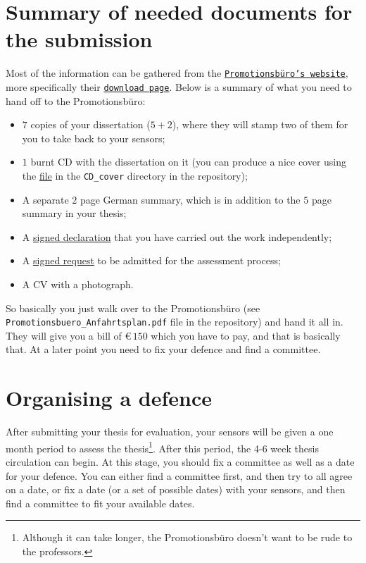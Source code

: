 \documentclass[a4paper]{article}
\begin{document}
    \section*{Summary of needed documents for the submission}
        Most of the information can be gathered from the \href{https://www.uni-frankfurt.de/42800906/startseite}{\texttt{Promotionsb\"uro's website}}, more specifically their \href{https://www.uni-frankfurt.de/42800991/downloads}{\texttt{download page}}.
        Below is a summary of what you need to hand off to the Promotionsb\"uro:
        \begin{itemize}
            \item $7$ copies of your dissertation ($5 + 2$), where they will stamp two of them for you to take back to your sensors;
            \item $1$ burnt CD with the dissertation on it (you can produce a nice cover using the \href{run:Cover.tex}{file} in the \texttt{CD\_cover} directory in the repository);
            \item A separate $2$ page German summary, which is in addition to the $5$ page summary in your thesis;
            \item A \href{run:Erlaerung_Formular.pdf}{signed declaration} that you have carried out the work independently;
            \item A \href{run:Antrag_Formular.pdf}{signed request} to be admitted for the assessment process;
            \item A CV with a photograph.
        \end{itemize}
        So basically you just walk over to the Promotionsb\"uro (see \texttt{Promotionsbuero\_Anfahrtsplan.pdf} file in the repository) and hand it all in.
        They will give you a bill of \euro$\,150$ which you have to pay, and that is basically that.
        At a later point you need to fix your defence and find a committee.

    \section*{Organising a defence}
      After submitting your thesis for evaluation, your sensors will be given a
      one month period to assess the thesis\footnote{Although it can take
        longer, the Promotionsb\"uro doesn't want to be rude to the
        professors.}. After this period, the 4-6 week thesis circulation can
      begin. At this stage, you should fix a committee as well as a date
      for your defence. You can either find a committee first, and then try to
      all agree on a date, or fix a date (or a set of possible dates) with your
      sensors, and then find a committee to fit your available dates.
\end{document}
